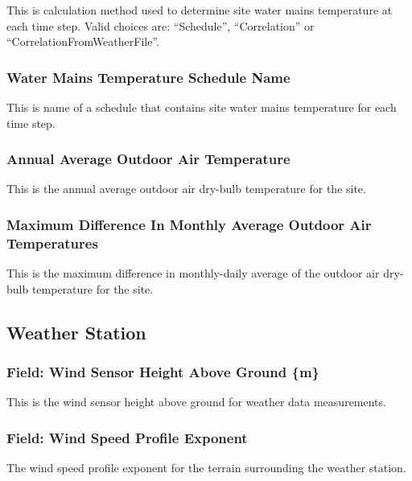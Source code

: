 This is calculation method used to determine site water mains temperature at each time step. Valid choices are: ``Schedule'', ``Correlation'' or ``CorrelationFromWeatherFile''.

\subsubsection{Water Mains Temperature Schedule Name}\label{water-mains-temperature-schedule-name}

This is name of a schedule that contains site water mains temperature for each time step.

\subsubsection{Annual Average Outdoor Air Temperature}\label{annual-average-outdoor-air-temperature}

This is the annual average outdoor air dry-bulb temperature for the site.

\subsubsection{Maximum Difference In Monthly Average Outdoor Air Temperatures}\label{maximum-difference-in-monthly-average-outdoor-air-temperatures}

This is the maximum difference in monthly-daily average of the outdoor air dry-bulb temperature for the site.

\subsection{Weather Station}\label{weather-station}

\subsubsection{Field: Wind Sensor Height Above Ground \{m\}}\label{field-wind-sensor-height-above-ground-m}

This is the wind sensor height above ground for weather data measurements.

\subsubsection{Field: Wind Speed Profile Exponent}\label{field-wind-speed-profile-exponent}

The wind speed profile exponent for the terrain surrounding the weather station.

